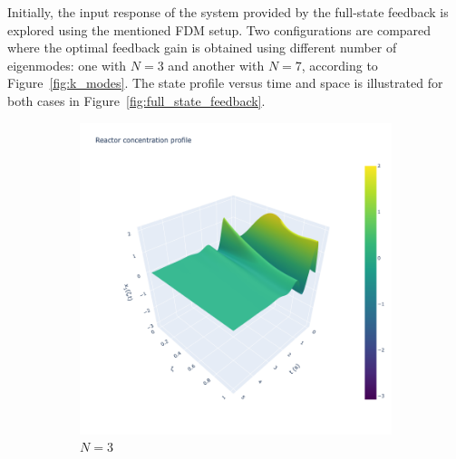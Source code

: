 Initially, the input response of the system provided by the full-state feedback is explored using the mentioned FDM setup. Two configurations are compared where the optimal feedback gain is obtained using different number of eigenmodes: one with $N=3$ and another with $N=7$, according to Figure~\ref{fig:k_modes}. The state profile versus time and space is illustrated for both cases in Figure~\ref{fig:full_state_feedback}. 

\begin{figure}[!htbp]
    \centering
    \begin{subfigure}[b]{0.45\textwidth}
        \includegraphics[width=\textwidth,trim=0 0 100 0,clip]{Figures/3D_x1_k3.png}
        \caption{$N=3$}
        \label{fig:3D_x1_k3}
    \end{subfigure}
    \hfill
    \begin{subfigure}[b]{0.45\textwidth}

\end{subfigure}
\end{figure}
